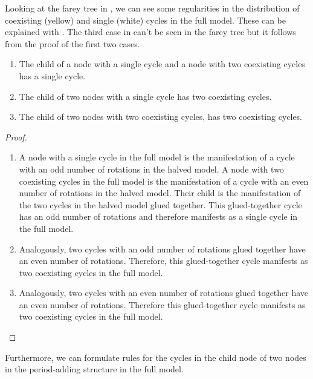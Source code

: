 Looking at the farey tree in , we can see some regularities in the distribution of coexisting (yellow) and single (white) cycles in the full model.
These can be explained with .
The third case in  can't be seen in the farey tree but it follows from the proof of the first two cases.

\begin{theorem}
	\label{theorem:child.coexistence}
	\begin{enumerate}
		\item The child of a node with a single cycle and a node with two coexisting cycles has a single cycle.
		\item The child of two nodes with a single cycle has two coexisting cycles.
		\item The child of two nodes with two coexisting cycles, has two coexisting cycles.
	\end{enumerate}
\end{theorem}

\begin{proof} \phantom{x}
	\begin{enumerate}
		\item A node with a single cycle in the full model is the manifestation of a cycle with an odd number of rotations in the halved model.
		      A node with two coexisting cycles in the full model is the manifestation of a cycle with an even number of rotations in the halved model.
		      Their child is the manifestation of the two cycles in the halved model glued together.
		      This glued-together cycle has an odd number of rotations and therefore manifests as a single cycle in the full model.
		\item Analogously, two cycles with an odd number of rotations glued together have an even number of rotations.
		      Therefore, this glued-together cycle manifests as two coexisting cycles in the full model.
		\item Analogously, two cycles with an even number of rotations glued together have an even number of rotations.
		      Therefore this glued-together cycle manifests as two coexisting cycles in the full model.
	\end{enumerate}
\end{proof}


Furthermore, we can formulate rules for the cycles in the child node of two nodes in the period-adding structure in the full model.

